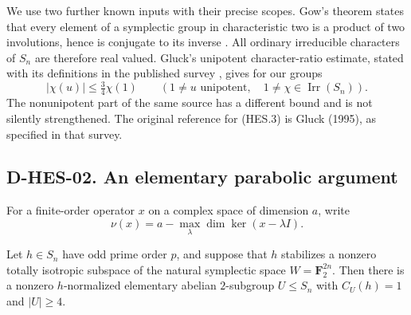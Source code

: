 We use two further known inputs with their precise scopes. Gow's theorem
states that every element of a symplectic group in characteristic two is
a product of two involutions, hence is conjugate to its inverse
\cite[theorem on p.~583; proof, Section~3, pp.~589--591]{HES:Gow1981}.
All ordinary irreducible characters of $S_n$ are therefore real valued.
Gluck's unipotent character-ratio estimate, stated with its definitions in
the published survey \cite[Theorem~2.4(i), author pp.~2--4]{HES:Liebeck2017},
gives for our groups
\[
       |\chi(u)|\le\tfrac34\chi(1)
          \qquad(1\ne u\text{ unipotent},\quad 1\ne\chi\in\operatorname{Irr}(S_n)).
\tag{HES.3}
\]
The nonunipotent part of the same source has a different bound and is not
silently strengthened. The original reference for (HES.3) is Gluck (1995),
as specified in that survey.

\subsection*{D-HES-02. An elementary parabolic argument}

For a finite-order operator $x$ on a complex space of dimension $a$, write
\[
           \nu(x)=a-\max_\lambda\dim\ker(x-\lambda I).
\]

\begin{lemma}
Let $h\in S_n$ have odd prime order $p$, and suppose that $h$ stabilizes
a nonzero totally isotropic subspace of the natural symplectic space
$W=\mathbf F_2^{2n}$. Then there is a nonzero $h$-normalized elementary
abelian $2$-subgroup $U\le S_n$ with $C_U(h)=1$ and $|U|\ge4$.
\end{lemma}

